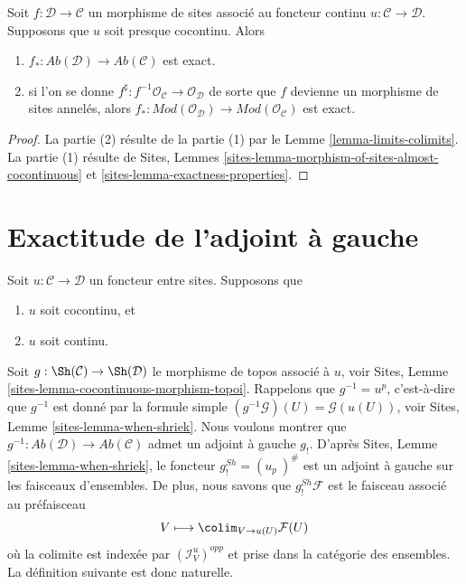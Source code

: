 \begin{lemma}
\label{lemma-morphism-ringed-sites-almost-cocontinuous}
Soit $f : \mathcal{D} \to \mathcal{C}$ un morphisme de sites associé au
foncteur continu $u : \mathcal{C} \to \mathcal{D}$. Supposons que $u$ soit
presque cocontinu. Alors
\begin{enumerate}
\item $f_* : \textit{Ab}(\mathcal{D}) \to \textit{Ab}(\mathcal{C})$ est
exact.
\item si l'on se donne
$f^\sharp : f^{-1}\mathcal{O}_\mathcal{C} \to \mathcal{O}_\mathcal{D}$ de
sorte que $f$ devienne un morphisme de sites annelés, alors
$f_* : \textit{Mod}(\mathcal{O}_\mathcal{D}) \to
\textit{Mod}(\mathcal{O}_\mathcal{C})$ est exact.
\end{enumerate}
\end{lemma}

\begin{proof}
La partie (2) résulte de la partie (1) par le Lemme
\ref{lemma-limits-colimits}. La partie (1) résulte de Sites, Lemmes
\ref{sites-lemma-morphism-of-sites-almost-cocontinuous} et
\ref{sites-lemma-exactness-properties}.
\end{proof}





\section{Exactitude de l'adjoint à gauche}
\label{section-exactness-lower-shriek}

\noindent
Soit $u : \mathcal{C} \to \mathcal{D}$ un foncteur entre sites. Supposons que
\begin{enumerate}
\item[(a)] $u$ soit cocontinu, et
\item[(b)] $u$ soit continu.
\end{enumerate}
Soit $g : \Sh(\mathcal{C}) \to \Sh(\mathcal{D})$ le morphisme de topos associé
à $u$, voir Sites, Lemme \ref{sites-lemma-cocontinuous-morphism-topoi}.
Rappelons que $g^{-1} = u^p$, c'est-à-dire que $g^{-1}$ est donné par la
formule simple
$(g^{-1}\mathcal{G})(U) = \mathcal{G}(u(U))$, voir Sites, Lemme
\ref{sites-lemma-when-shriek}.
Nous voulons montrer que
$g^{-1} : \textit{Ab}(\mathcal{D}) \to \textit{Ab}(\mathcal{C})$
admet un adjoint à gauche $g_!$. D'après Sites, Lemme
\ref{sites-lemma-when-shriek}, le foncteur
$g^{Sh}_! = (u_p\ )^\#$ est un adjoint à gauche sur les faisceaux d'ensembles.
De plus, nous savons que $g^{Sh}_!\mathcal{F}$ est le faisceau associé au
préfaisceau
$$
V \longmapsto \colim_{V \to u(U)} \mathcal{F}(U)
$$
où la colimite est indexée par $(\mathcal{I}_V^u)^{opp}$ et prise dans la
catégorie des ensembles. La définition suivante est donc naturelle.


